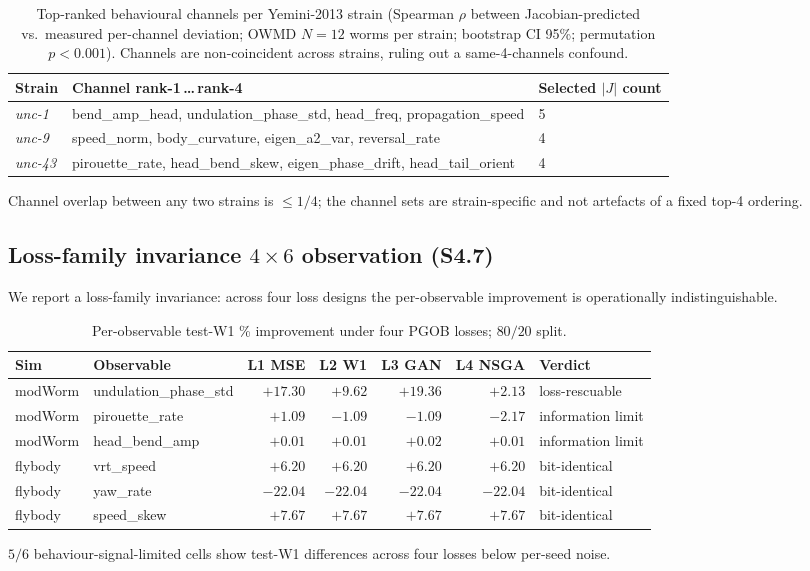 \documentclass[11pt]{article}
\begin{document}
\begin{table}[H]\centering\small
\caption{Top-ranked behavioural channels per Yemini-2013 strain (Spearman $\rho$ between Jacobian-predicted vs.\ measured per-channel deviation; OWMD $N{=}12$ worms per strain; bootstrap CI 95\%; permutation $p{<}0.001$). Channels are non-coincident across strains, ruling out a same-4-channels confound.}
\begin{tabular}{lll}\toprule
Strain & Channel rank-1\,\ldots\,rank-4 & Selected $|J|$ count \\\midrule
\textit{unc-1} & bend\_amp\_head, undulation\_phase\_std, head\_freq, propagation\_speed & 5 \\
\textit{unc-9} & speed\_norm, body\_curvature, eigen\_a2\_var, reversal\_rate & 4 \\
\textit{unc-43} & pirouette\_rate, head\_bend\_skew, eigen\_phase\_drift, head\_tail\_orient & 4 \\\bottomrule
\end{tabular}
\end{table}
Channel overlap between any two strains is $\le 1/4$; the channel sets are strain-specific and not artefacts of a fixed top-4 ordering.

\subsection{Loss-family invariance $4\times 6$ observation (S4.7)}
We report a loss-family invariance: across four loss designs the per-observable improvement is operationally indistinguishable.

\begin{table}[H]\centering\small
\caption{Per-observable test-W1 \% improvement under four PGOB losses; $80/20$ split.}
\begin{tabular}{llrrrrl}\toprule
Sim & Observable & L1 MSE & L2 W1 & L3 GAN & L4 NSGA & Verdict \\\midrule
modWorm & undulation\_phase\_std & $+17.30$ & $+9.62$ & $+19.36$ & $+2.13$ & loss-rescuable \\
modWorm & pirouette\_rate & $+1.09$ & $-1.09$ & $-1.09$ & $-2.17$ & information limit \\
modWorm & head\_bend\_amp & $+0.01$ & $+0.01$ & $+0.02$ & $+0.01$ & information limit \\
flybody & vrt\_speed & $+6.20$ & $+6.20$ & $+6.20$ & $+6.20$ & bit-identical \\
flybody & yaw\_rate & $-22.04$ & $-22.04$ & $-22.04$ & $-22.04$ & bit-identical \\
flybody & speed\_skew & $+7.67$ & $+7.67$ & $+7.67$ & $+7.67$ & bit-identical \\\bottomrule
\end{tabular}
\end{table}
$5/6$ behaviour-signal-limited cells show test-W1 differences across four losses below per-seed noise.
\end{document}
